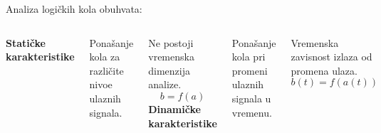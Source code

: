 \begin{frame}[label=08-s004]
Analiza logičkih kola obuhvata:
\medskip
\begin{columns}[T,onlytextwidth]
\textbf{\alert{Statičke karakteristike}}\par\medskip
Ponašanje kola za različite nivoe ulaznih signala.\par
Ne postoji vremenska dimenzija analize.
\[b=f(a)\]
\textbf{\alert{Dinamičke karakteristike}}\par\medskip
Ponašanje kola pri promeni ulaznih signala u vremenu.\par
Vremenska zavisnost izlaza od promena ulaza.
\[b(t)=f(a(t))\]
\end{columns}
\end{frame}
